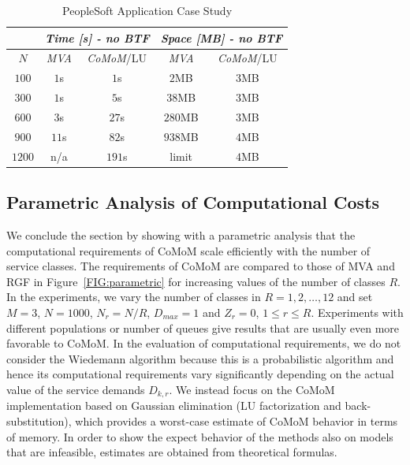 \documentclass[journal,twocolumn,9.5pt]{IEEEtran}
\begin{document}
\begin{table}[t]
\centering
\renewcommand{\arraystretch}{1.1}
\caption{PeopleSoft Application Case Study}
\label{TAB:peoplesoftcomparison}
\begin{tabular}{|c|c|c|c|c|}
\hline
 & \multicolumn{2}{c|}{\em Time [s] - no BTF} & \multicolumn{2}{c|}{\em Space [MB] - no BTF} \\
\hline
\emph{$N$}& \emph{MVA} & \emph{CoMoM}/LU & \emph{MVA} & \emph{CoMoM}/LU \\
\hline
$100$ & $1$s & $1$s & $2$MB & $3$MB \\
$300$ & $1$s & $5$s & $38$MB & $3$MB \\
$600$ & $3$s & $27$s & $280$MB & $3$MB \\
$900$ & $11$s & $82$s & $938$MB & $4$MB \\
$1200$ & n/a & $191$s & limit & $4$MB \\
\hline
\end{tabular}
\end{table}
\subsection{Parametric Analysis of Computational Costs}
\label{SEC:parametric}
We conclude the section by showing with a parametric analysis that the computational requirements of CoMoM scale efficiently with the number of service classes. The requirements of CoMoM are compared to those of MVA and RGF in Figure~\ref{FIG:parametric} for increasing values of the number of classes $R$. In the experiments, we vary the number of classes in $R=1,2,\ldots,12$ and set $M=3$, $N=1000$, $N_r=N/R$, $D_{max}=1$ and $Z_r=0$, $1\leq r\leq R$. Experiments with different populations or number of queues give results that are usually even more favorable to CoMoM. In the evaluation of computational requirements, we do not consider the Wiedemann algorithm because this is a probabilistic algorithm and hence its computational requirements vary significantly depending on the actual value of the service demands $D_{k,r}$. We instead focus on the CoMoM implementation based on Gaussian elimination (LU factorization and back-substitution), which provides a worst-case estimate of CoMoM behavior in terms of memory. In order to show the expect behavior of the methods also on models that are infeasible, estimates are obtained from theoretical formulas.
\end{document}
